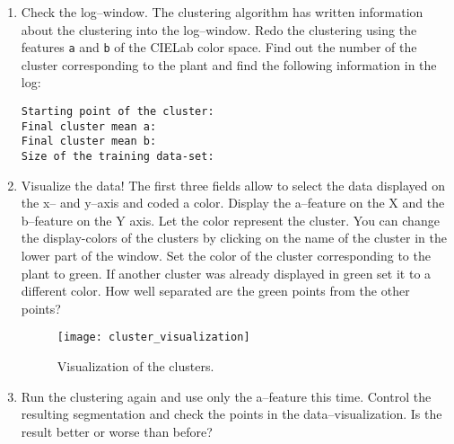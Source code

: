 \begin{enumerate}
\begin{verbatim}
\end{verbatim}
\item Check the log--window. The clustering algorithm has written information about the clustering into the log--window. Redo the clustering using the features {\tt a} and {\tt b} of the CIELab color space. Find out the number of the cluster corresponding to the plant and find the following information in the log:
\begin{verbatim}
Starting point of the cluster:
Final cluster mean a:
Final cluster mean b:
Size of the training data-set:
\end{verbatim}
\item Visualize the data! The first three fields allow to select the data displayed on the x-- and y--axis and coded a color. Display the a--feature on the X and the b--feature on the Y axis. Let the color represent the cluster. You can change the display-colors of the clusters by clicking on the name of the cluster in the lower part of the window. Set the color of the cluster corresponding to the plant to green. If another cluster was already displayed in green set  it to a different color.
How well separated are the green points from the other points?

\begin{figure}[!htb]
 \centering
 \texttt{[image: cluster\_visualization]}
 \caption{Visualization of the clusters.}
 \label{figure:cluster-visualization}
\end{figure}

\item Run the clustering again and use only the a--feature this time. Control the resulting segmentation and check the points in the data--visualization. Is the result better or worse than before?
\begin{verbatim}



\end{verbatim}
\end{enumerate}

